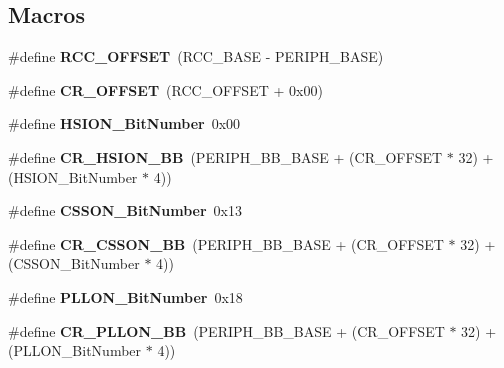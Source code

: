 \subsection*{Macros}
\begin{DoxyCompactItemize}
\item 
\hypertarget{group___r_c_c_ga539e07c3b3c55f1f1d47231341fb11e1}{\#define {\bfseries R\-C\-C\-\_\-\-O\-F\-F\-S\-E\-T}~(R\-C\-C\-\_\-\-B\-A\-S\-E -\/ P\-E\-R\-I\-P\-H\-\_\-\-B\-A\-S\-E)}\label{group___r_c_c_ga539e07c3b3c55f1f1d47231341fb11e1}

\item 
\hypertarget{group___r_c_c_gafa1d3d0ea72132df651c76fc1bdffffc}{\#define {\bfseries C\-R\-\_\-\-O\-F\-F\-S\-E\-T}~(R\-C\-C\-\_\-\-O\-F\-F\-S\-E\-T + 0x00)}\label{group___r_c_c_gafa1d3d0ea72132df651c76fc1bdffffc}

\item 
\hypertarget{group___r_c_c_ga3d3085e491cbef815d223afbe5bf1930}{\#define {\bfseries H\-S\-I\-O\-N\-\_\-\-Bit\-Number}~0x00}\label{group___r_c_c_ga3d3085e491cbef815d223afbe5bf1930}

\item 
\hypertarget{group___r_c_c_gac3290a833c0e35ec17d32c2d494e6133}{\#define {\bfseries C\-R\-\_\-\-H\-S\-I\-O\-N\-\_\-\-B\-B}~(P\-E\-R\-I\-P\-H\-\_\-\-B\-B\-\_\-\-B\-A\-S\-E + (C\-R\-\_\-\-O\-F\-F\-S\-E\-T $\ast$ 32) + (H\-S\-I\-O\-N\-\_\-\-Bit\-Number $\ast$ 4))}\label{group___r_c_c_gac3290a833c0e35ec17d32c2d494e6133}

\item 
\hypertarget{group___r_c_c_ga253fa44d87aabc55f0cd6628e77a51fd}{\#define {\bfseries C\-S\-S\-O\-N\-\_\-\-Bit\-Number}~0x13}\label{group___r_c_c_ga253fa44d87aabc55f0cd6628e77a51fd}

\item 
\hypertarget{group___r_c_c_gaca914aed10477ae4090fea0a9639b1ea}{\#define {\bfseries C\-R\-\_\-\-C\-S\-S\-O\-N\-\_\-\-B\-B}~(P\-E\-R\-I\-P\-H\-\_\-\-B\-B\-\_\-\-B\-A\-S\-E + (C\-R\-\_\-\-O\-F\-F\-S\-E\-T $\ast$ 32) + (C\-S\-S\-O\-N\-\_\-\-Bit\-Number $\ast$ 4))}\label{group___r_c_c_gaca914aed10477ae4090fea0a9639b1ea}

\item 
\hypertarget{group___r_c_c_gab24d7f5f8e4b3b717fd91b54f393f6a3}{\#define {\bfseries P\-L\-L\-O\-N\-\_\-\-Bit\-Number}~0x18}\label{group___r_c_c_gab24d7f5f8e4b3b717fd91b54f393f6a3}

\item 
\hypertarget{group___r_c_c_ga3f1fb2589cb8b5ac2f7121aba1135a5f}{\#define {\bfseries C\-R\-\_\-\-P\-L\-L\-O\-N\-\_\-\-B\-B}~(P\-E\-R\-I\-P\-H\-\_\-\-B\-B\-\_\-\-B\-A\-S\-E + (C\-R\-\_\-\-O\-F\-F\-S\-E\-T $\ast$ 32) + (P\-L\-L\-O\-N\-\_\-\-Bit\-Number $\ast$ 4))}\label{group___r_c_c_ga3f1fb2589cb8b5ac2f7121aba1135a5f}


\end{DoxyCompactItemize}
